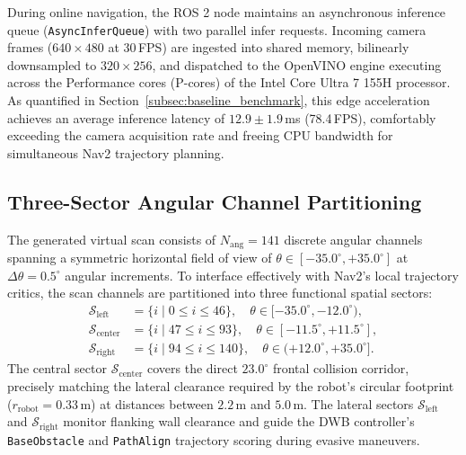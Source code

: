 \documentclass{ieeeaccess}
\begin{document}
During online navigation, the ROS 2 node maintains an asynchronous inference queue (\texttt{AsyncInferQueue}) with two parallel infer requests. Incoming camera frames ($640 \times 480$ at 30\,FPS) are ingested into shared memory, bilinearly downsampled to $320 \times 256$, and dispatched to the OpenVINO engine executing across the Performance cores (P-cores) of the Intel Core Ultra 7 155H processor. As quantified in Section~\ref{subsec:baseline_benchmark}, this edge acceleration achieves an average inference latency of $12.9 \pm 1.9$\,ms (78.4\,FPS), comfortably exceeding the camera acquisition rate and freeing CPU bandwidth for simultaneous Nav2 trajectory planning.

\subsection{Three-Sector Angular Channel Partitioning}
\label{subsec:sector_partitioning}
The generated virtual scan consists of $N_{\mathrm{ang}} = 141$ discrete angular channels spanning a symmetric horizontal field of view of $\theta \in [-35.0^\circ, +35.0^\circ]$ at $\Delta \theta = 0.5^\circ$ angular increments. To interface effectively with Nav2's local trajectory critics, the scan channels are partitioned into three functional spatial sectors:
\begin{align}
  \mathcal{S}_{\mathrm{left}}   &= \{i \mid 0 \le i \le 46\},   \quad \theta \in [-35.0^\circ, -12.0^\circ), \\
  \mathcal{S}_{\mathrm{center}} &= \{i \mid 47 \le i \le 93\},  \quad \theta \in [-11.5^\circ, +11.5^\circ], \\
  \mathcal{S}_{\mathrm{right}}  &= \{i \mid 94 \le i \le 140\}, \quad \theta \in (+12.0^\circ, +35.0^\circ].
\end{align}
The central sector $\mathcal{S}_{\mathrm{center}}$ covers the direct $23.0^\circ$ frontal collision corridor, precisely matching the lateral clearance required by the robot's circular footprint ($r_{\mathrm{robot}} = 0.33$\,m) at distances between $2.2$\,m and $5.0$\,m. The lateral sectors $\mathcal{S}_{\mathrm{left}}$ and $\mathcal{S}_{\mathrm{right}}$ monitor flanking wall clearance and guide the DWB controller's \texttt{BaseObstacle} and \texttt{PathAlign} trajectory scoring during evasive maneuvers.
\end{document}
